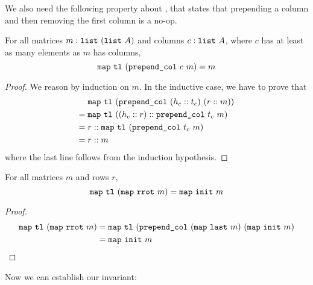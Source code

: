 \documentclass[sigplan,10pt,anonymous,review]{thesis}
\begin{document}
We also need the following property about , that
states that prepending a column and then removing the first column is
a no-op.
\begin{theorem}
  For all matrices $m : \texttt{\textup{list}}~(\texttt{\textup{list}}~A)$ and columns $c :
  \texttt{\textup{list}}~A$, where $c$ has at least as many elements as $m$ has columns,
  \begin{equation*}
      \texttt{\textup{map}}~\texttt{\textup{tl}}~(\texttt{\textup{prepend\_col}}~c~m) = m
  \end{equation*}
\end{theorem}
\begin{proof}
  We reason by induction on $m$. In the inductive case, we have to
  prove that
  \begin{align*}
    &\texttt{\textup{map}}~\texttt{\textup{tl}}~(\texttt{\textup{prepend\_col}}~(h_c :: t_c)~(r :: m)) \\
    ={}&\texttt{\textup{map}}~\texttt{\textup{tl}}~((h_c :: r) :: \texttt{\textup{prepend\_col}}~t_c~m) \\
    ={}&r :: \texttt{\textup{map}}~\texttt{\textup{tl}}~(\texttt{\textup{prepend\_col}}~t_c~m) \\
    ={}&r :: m
  \end{align*}
  where the last line follows from the induction hypothesis.
\end{proof}

\begin{corollary}
  For all matrices $m$ and rows $r$,
  \begin{equation*}
    \texttt{\textup{map}}~\texttt{\textup{tl}}~(\texttt{\textup{map}}~\texttt{\textup{rrot}}~m) = \texttt{\textup{map}}~\texttt{\textup{init}}~m
  \end{equation*}
\end{corollary}
\begin{proof}
  \begin{align*}
    \texttt{\textup{map}}~\texttt{\textup{tl}}~(\texttt{\textup{map}}~\texttt{\textup{rrot}}~m) &= \texttt{\textup{map}}~\texttt{\textup{tl}}~(\texttt{\textup{prepend\_col}}~(\texttt{\textup{map}}~\texttt{\textup{last}}~m)~(\texttt{\textup{map}}~\texttt{\textup{init}}~m) \\
    &= \texttt{\textup{map}}~\texttt{\textup{init}}~m \qedhere
  \end{align*}
\end{proof}

Now we can establish our invariant:
\end{document}
